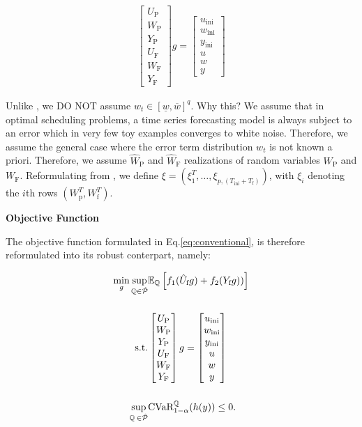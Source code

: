 \documentclass[12pt, a4paper]{article}
\begin{document}
\begin{align}
        \begin{bmatrix}
        U_\text{P} \\
        W_\text{P} \\
        Y_\text{P} \\
        U_\text{F} \\
        W_\text{F} \\
        Y_\text{F}
        \end{bmatrix} g =
        \begin{bmatrix}
        u_\text{ini} \\
        w_\text{ini} \\
        y_\text{ini} \\
        u \\
        w \\
        y
        \end{bmatrix}
\end{align}

\noindent Unlike \cite{huang2021decentralized}, we DO NOT assume $w_{t} \in [\underline{w}
, \overline{w}]^q$. Why this? We assume that in optimal scheduling problems, a time series forecasting model is always subject to an error which in very few toy examples converges to white noise. Therefore, we assume the general case where the error term distribution $w_t$ is not known a priori. 
Therefore, we assume $\hat{W}_\text{P}$ and $\hat{W}_\text{F}$ realizations of random variables $W_\text{P}$ and $W_\text{F}$. Reformulating from \cite{coulson2021distributionally}, we define $\xi = (\xi_{1}^T, \dots, \xi_{p, (T_{\text{ini}}+T_{\text{f}})})$, with $\xi_i$ denoting the $i$th rows $(W_{\text{p}}^T, W_{\text{f}}^T)$. 

\textbf{Objective Function}

The objective function formulated in Eq.\ref{eq:conventional}, is therefore reformulated into its robust conterpart, namely: 

\begin{align}
   \min_{g} \sup_{\mathbb{Q} \in \hat{\mathcal{P}}}& \mathbb{E}_\mathbb{Q} \left[f_1(\hat{U}_\text{f}g) + f_2(Y_\text{f}g))\right] \notag \\[0.5cm]
   \text{s.t.} &\begin{bmatrix}
    U_\text{P} \\
    W_\text{P} \\
    Y_\text{P} \\
    U_\text{F} \\
    W_\text{F} \\
    Y_\text{F}
    \end{bmatrix} g =
    \begin{bmatrix}
    u_\text{ini} \\
    w_\text{ini} \\
    y_\text{ini} \\
    u \\
    w \\
    y
    \end{bmatrix} \notag \\[0.5cm]
   \sup_{\mathbb{Q} \: \in \hat{\mathcal{P}}}& \text{CVaR}_{1-\alpha}^{\mathbb{Q}}(h(y)) \leq 0.
\end{align}


 

\end{document}
